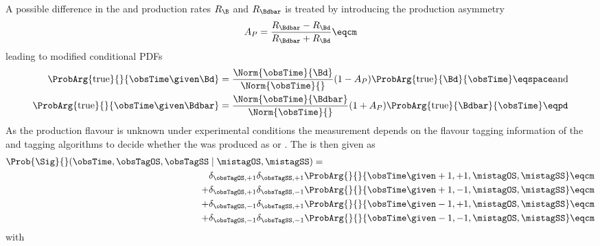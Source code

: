 %
A possible difference in the \Bd and \Bdbar production rates $R_{\B}$ and
$R_{\Bdbar}$ is treated by introducing the production asymmetry
%
\begin{equation}\label{eq:measurement_of_sin2beta:likelihood_fit:model:decay_time:production_asymmetry}
  A_P = \frac{R_{\Bdbar} - R_{\Bd}}{R_{\Bdbar} + R_{\Bd}}\eqcm
\end{equation}
%
leading to modified conditional \acp{PDF}
%
\begin{equation}\label{eq:measurement_of_sin2beta:likelihood_fit:model:decay_time:true_pdf}
  \begin{split}
    \ProbArg{\text{true}}{}{\obsTime\given\Bd}    &= \frac{\Norm{\obsTime}{\Bd}}{\Norm{\obsTime}{}}    (1 - A_P) \ProbArg{\text{true}}{\Bd}{\obsTime}     \eqspace \text{and} \\
    \ProbArg{\text{true}}{}{\obsTime\given\Bdbar} &= \frac{\Norm{\obsTime}{\Bdbar}}{\Norm{\obsTime}{}} (1 + A_P) \ProbArg{\text{true}}{\Bdbar}{\obsTime}  \eqpd
  \end{split}
\end{equation}
%
As the production flavour is unknown under experimental conditions the
measurement depends on the flavour tagging information of the \OS and \SSpi
tagging algorithms to decide whether the \Bmeson was produced as \Bd or \Bdbar.
The \PDF is then given as
%
\begin{equation}\label{eq:measurement_of_sin2beta:likelihood_fit:model:decay_time:measured_pdf_tagged_only}
\begin{split}
  \Prob{\Sig}{}(\obsTime, \obsTagOS, \obsTagSS &\mid \mistagOS, \mistagSS) = \\
        &\delta_{\obsTagOS,+1}\delta_{\obsTagSS,+1} \ProbArg{}{}{\obsTime \given +1, +1, \mistagOS, \mistagSS} \eqcm \\
      + &\delta_{\obsTagOS,+1}\delta_{\obsTagSS,-1} \ProbArg{}{}{\obsTime \given +1, -1, \mistagOS, \mistagSS} \eqcm \\
      + &\delta_{\obsTagOS,-1}\delta_{\obsTagSS,+1} \ProbArg{}{}{\obsTime \given -1, +1, \mistagOS, \mistagSS} \eqcm \\
      + &\delta_{\obsTagOS,-1}\delta_{\obsTagSS,-1} \ProbArg{}{}{\obsTime \given -1, -1, \mistagOS, \mistagSS} \eqcm 
  \end{split}
\end{equation}
%
with
%
